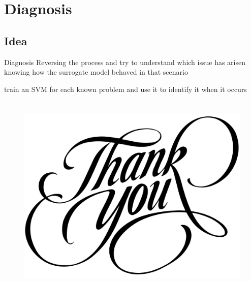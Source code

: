 \documentclass{beamer}
\def\itemizespace{\vspace{7mm}}
\begin{document}
\section{Diagnosis}
\subsection{Idea}
\begin{frame}{Diagnosis}
	Reversing the process and try to understand which issue has arisen knowing
	how the surrogate model behaved in that scenario
	
	\itemizespace%

	\begin{description}[<2->]
		\item[Series of SVM:]train an SVM for each known problem and use it
			to identify it when it occurs
		\itemizespace%

		\item[Neural Network]
	\end{description}
\end{frame}

\section{}
\begin{frame}
	\begin{figure}
		\centering
		\includegraphics[height=0.4\textheight]{thank-you.jpg}
	\end{figure}
\end{frame}
\end{document}
